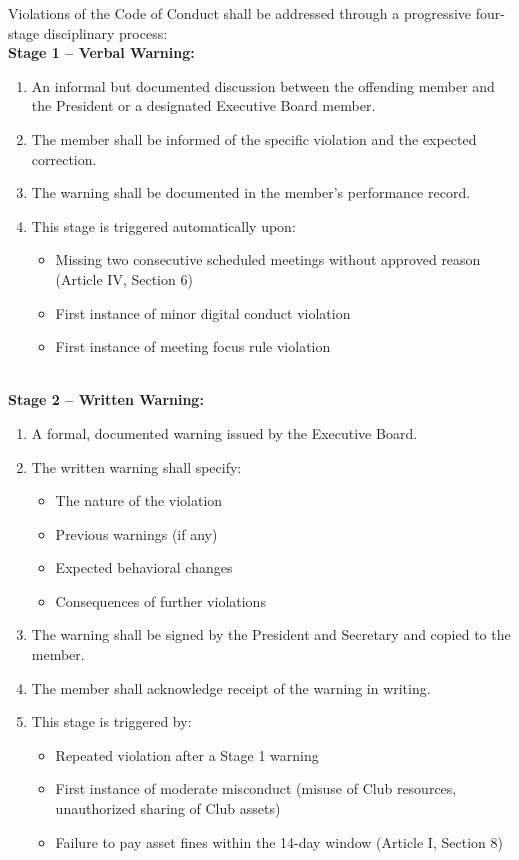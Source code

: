 Violations of the Code of Conduct shall be addressed through a progressive four-stage disciplinary process:
\\
\textbf{Stage 1 -- Verbal Warning:}
\begin{enumerate}[label=\alph*), leftmargin=2em, itemsep=0.3em]
    \item An informal but documented discussion between the offending member and the President or a designated Executive Board member.
    \item The member shall be informed of the specific violation and the expected correction.
    \item The warning shall be documented in the member's performance record.
    \item This stage is triggered automatically upon:
    \begin{itemize}[leftmargin=1.5em, itemsep=0.2em]
        \item Missing two consecutive scheduled meetings without approved reason (Article IV, Section 6)
        \item First instance of minor digital conduct violation
        \item First instance of meeting focus rule violation
    \end{itemize}
\end{enumerate}
\\
\textbf{Stage 2 -- Written Warning:}
\begin{enumerate}[label=\alph*), leftmargin=2em, itemsep=0.3em]
    \item A formal, documented warning issued by the Executive Board.
    \item The written warning shall specify:
    \begin{itemize}[leftmargin=1.5em, itemsep=0.2em]
        \item The nature of the violation
        \item Previous warnings (if any)
        \item Expected behavioral changes
        \item Consequences of further violations
    \end{itemize}
    \item The warning shall be signed by the President and Secretary and copied to the member.
    \item The member shall acknowledge receipt of the warning in writing.
    \item This stage is triggered by:
    \begin{itemize}[leftmargin=1.5em, itemsep=0.2em]
        \item Repeated violation after a Stage 1 warning
        \item First instance of moderate misconduct (misuse of Club resources, unauthorized sharing of Club assets)
        \item Failure to pay asset fines within the 14-day window (Article I, Section 8)
    \end{itemize}
\end{enumerate}
